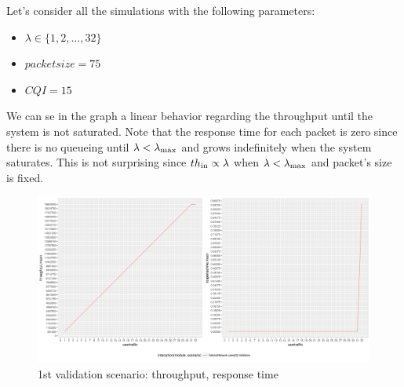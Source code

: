 Let's consider all the simulations with the following parameters:
\begin{itemize}
	\item \(\lambda \in \{1,2,\ldots,32\}\)
	\item \(packetsize=75\)
	\item \(CQI=15\)
\end{itemize}
  We can se in the graph a linear behavior regarding the throughput until the system is not saturated. Note that the response time for each packet is zero since there is no queueing until \(\lambda < \lambda\textsubscript{max}\) and grows indefinitely when the system saturates. This is not surprising since \(th\textsubscript{in} \propto \lambda\) when \(\lambda < \lambda\textsubscript{max}\) and packet's size is fixed.
\begin{figure}[H]
  \includegraphics[width=1\textwidth]{images/plotvalidation}
  \caption{1st validation scenario: throughput, response time}
  \label{fig:1st validation scenario: throughput, response time}
\end{figure}

